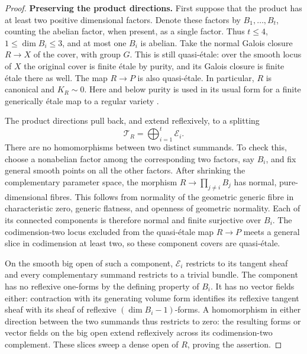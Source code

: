 \begin{proof}
\textbf{Preserving the product directions.}
First suppose that the product has at least two positive dimensional
factors.  Denote these factors by \(B_1,\ldots,B_t\), counting the abelian
factor, when present, as a single factor.  Thus \(t\le4\),
\(1\le\dim B_i\le3\), and at most one \(B_i\) is abelian.  Take the normal
Galois closure \(R\to X\) of the cover, with group \(G\).  This is still
quasi-\'etale: over the smooth locus of \(X\) the original cover is finite
\'etale by purity, and its Galois closure is finite \'etale there as well.
The map \(R\to P\) is also quasi-\'etale.  In particular, \(R\) is canonical
and \(K_R\sim0\).  Here and below purity is used in its usual form for a
finite generically \'etale map to a regular variety
\cite[Tag~0BMB]{StacksProject}.

The product directions pull back, and extend reflexively, to a splitting
\begin{equation}\label{eq:index-directions}
                     \mathcal T_R=\bigoplus_{i=1}^t\mathcal E_i.
\end{equation}
There are no homomorphisms between two distinct summands.  To check this,
choose a nonabelian factor among the corresponding two factors, say
\(B_i\), and fix general smooth points on all the other factors.  After
shrinking the complementary parameter space, the morphism
\(R\to\prod_{j\ne i}B_j\) has normal, pure-dimensional fibres.  This follows
from normality of the geometric generic fibre in characteristic zero,
generic flatness, and openness of geometric normality.  Each of its
connected components is therefore normal and finite surjective over
\(B_i\).  The codimension-two locus excluded from the quasi-\'etale map
\(R\to P\) meets a general slice in codimension at least two, so these
component covers are quasi-\'etale.

On the smooth big open of such a component, \(\mathcal E_i\) restricts to
its tangent sheaf and every complementary summand restricts to a trivial
bundle.  The component has no reflexive one-forms by the defining property
of \(B_i\).  It has no vector fields either: contraction with its generating
volume form identifies its reflexive tangent sheaf with its sheaf of
reflexive \((\dim B_i-1)\)-forms.  A homomorphism in either direction between
the two summands thus restricts to zero: the resulting forms or vector
fields on the big open extend reflexively across its codimension-two
complement.  These slices sweep a dense open
of \(R\), proving the assertion.


\end{proof}
